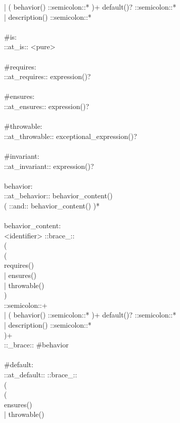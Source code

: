 \begin{bigbigpre}
  | ( behavior() ::semicolon::* )+ default()? ::semicolon::* \\
  | description() ::semicolon::* \\
 \\
#is: \\
    ::at_is:: <pure> \\
 \\
#requires: \\
    ::at_requires:: expression()? \\
 \\
#ensures: \\
    ::at_ensures:: expression()? \\
 \\
#throwable: \\
    ::at_throwable:: exceptional_expression()? \\
 \\
#invariant: \\
    ::at_invariant:: expression()? \\
 \\
behavior: \\
    ::at_behavior:: behavior_content() \\
    ( ::and:: behavior_content() )* \\
 \\
behavior_content: \\
    <identifier> ::brace_:: \\
    ( \\
        ( \\
            requires() \\
          | ensures() \\
          | throwable() \\
        ) \\
        ::semicolon::+ \\
      | ( behavior() ::semicolon::* )+ default()? ::semicolon::* \\
      | description() ::semicolon::* \\
    )+ \\
    ::_brace:: #behavior \\
 \\
#default: \\
    ::at_default:: ::brace_:: \\
    ( \\
        ( \\
            ensures() \\
          | throwable() \\

\end{bigbigpre}
